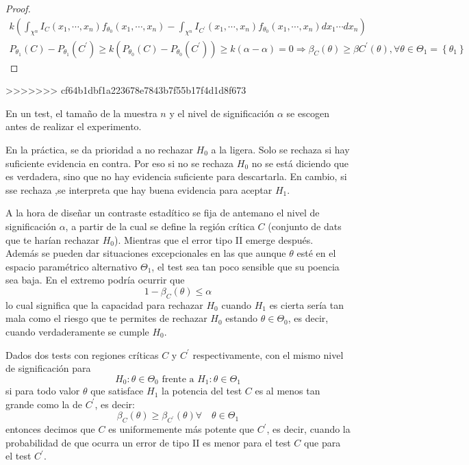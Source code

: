 \begin{proof}
$$\begin{gathered}
k\left(\int_{\chi^{n}} I_{C}\left(x_{1}, \cdots, x_{n}\right) f_{\theta_{0}}\left(x_{1}, \cdots, x_{n}\right)-\int_{\chi^{n}} I_{C^{\prime}}\left(x_{1}, \cdots, x_{n}\right) f_{\theta_{0}}\left(x_{1}, \cdots, x_{n}\right) d x_{1} \cdots d x_{n}\right) \\
P_{\theta_{1}}(C)-P_{\theta_{1}}\left(C^{\prime}\right) \geq k\left(P_{\theta_{0}}(C)-P_{\theta_{0}}\left(C^{\prime}\right)\right) \geq k(\alpha-\alpha)=0 \Rightarrow \beta_{C}(\theta) \geq \beta C^{\prime}(\theta), \forall \theta \in \Theta_{1}=\left\{\theta_{1}\right\}
\end{gathered}
$$
\end{proof}

>>>>>>> cf64b1dbf1a223678e7843b7f55b17f4d1d8f673
\begin{observación}
    En un test, el tamaño de la muestra $n$ y el nivel de significación $\alpha$ se escogen antes de realizar el experimento.
\end{observación}

\begin{observación}
    En la práctica, se da prioridad a no rechazar $H_0$ a la ligera. Solo se rechaza si hay suficiente evidencia en contra. Por eso si no se rechaza $H_0$ no se está diciendo que es verdadera, sino que no hay evidencia suficiente para descartarla. En cambio, si sse rechaza ,se interpreta que hay buena evidencia para aceptar $H_1$. 
\end{observación}

\begin{observación}
    A la hora de diseñar un contraste estadítico se fija de antemano el nivel de significación $\alpha$, a partir de la cual se define la región crítica $C$ (conjunto de dats que te harían rechazar $H_0$). Mientras que el error tipo II emerge después. \\
    Además se pueden dar situaciones excepcionales en las que aunque $\theta$ esté en el espacio paramétrico alternativo $\Theta_1$, el test sea tan poco sensible que su poencia sea baja. En el extremo podría ocurrir que
    $$1 - \beta_C(\theta) \leq \alpha$$
    lo cual significa que la capacidad para rechazar $H_0$ cuando $H_1$ es cierta sería tan mala como el riesgo que te permites de rechazar $H_0$ estando $\theta \in \Theta_0$, es decir, cuando verdaderamente se cumple $H_0$.
\end{observación}

\begin{definición}  
    Dados dos tests con regiones críticas $C$ y $C^{\prime}$ respectivamente, con el mismo nivel de significación para
    $$H_{0}: \theta \in \Theta_{0} \text{ frente a } H_{1}: \theta \in \Theta_{1}$$
    si para todo valor $\theta$ que satisface $H_1$ la potencia del test $C$ es al menos tan grande como la de $C^{\prime}$, es decir:
    $$\beta_{C}(\theta) \geq \beta_{C^{\prime}}(\theta) \forall \quad \theta \in \Theta_1$$  
    entonces decimos que $C$ es uniformemente más potente que $C^{\prime}$, es decir, cuando la probabilidad de que ocurra un error de tipo II es menor para el test $C$ que para el test $C^{\prime}$.
\end{definición}

